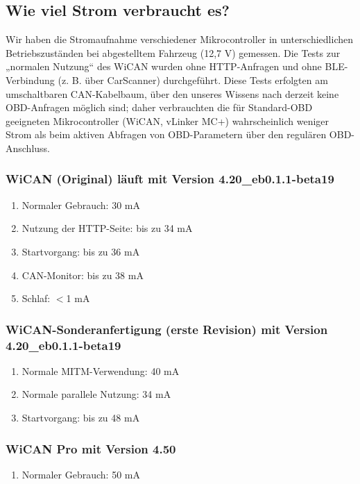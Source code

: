 \documentclass[superscriptaddress,onecolumn,floatfix]{revtex4-2}
\begin{document}
\subsection{Wie viel Strom verbraucht es?}

Wir haben die Stromaufnahme verschiedener Mikrocontroller in unterschiedlichen Betriebszuständen bei abgestelltem Fahrzeug (12,7 V) gemessen. Die Tests zur „normalen Nutzung“ des WiCAN wurden ohne HTTP-Anfragen und ohne BLE-Verbindung (z. B. über CarScanner) durchgeführt. Diese Tests erfolgten am umschaltbaren CAN-Kabelbaum, über den unseres Wissens nach derzeit keine OBD-Anfragen möglich sind; daher verbrauchten die für Standard-OBD geeigneten Mikrocontroller (WiCAN, vLinker MC+) wahrscheinlich weniger Strom als beim aktiven Abfragen von OBD-Parametern über den regulären OBD-Anschluss. 

\subsubsection{WiCAN (Original) läuft mit Version 4.20\_eb0.1.1-beta19}
\begin{enumerate}
  \item{Normaler Gebrauch:} 30 mA
  \item{Nutzung der HTTP-Seite:} bis zu 34 mA
  \item{Startvorgang:} bis zu 36 mA
  \item{CAN-Monitor:} bis zu 38 mA
  \item{Schlaf:} $<$1 mA
\end{enumerate}

\subsubsection{WiCAN-Sonderanfertigung (erste Revision) mit Version 4.20\_eb0.1.1-beta19}
\begin{enumerate}
  \item{Normale MITM-Verwendung:} 40 mA
  \item{Normale parallele Nutzung:} 34 mA
  \item{Startvorgang:} bis zu 48 mA
\end{enumerate}

\subsubsection{WiCAN Pro mit Version 4.50}
\begin{enumerate}
  \item{Normaler Gebrauch:} 50 mA
\end{enumerate}
\end{document}
